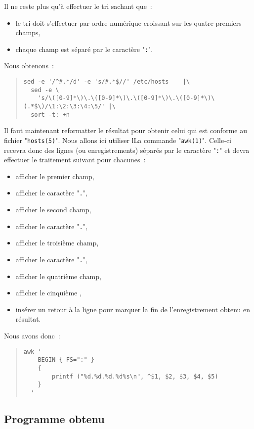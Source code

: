 Il ne reste plus qu'{\`a} effectuer le tri sachant que~:
\begin{itemize}
	\item	le tri doit s'effectuer par ordre num{\'e}rique croissant sur les
			quatre premiers champs,
	\item	chaque champ est s{\'e}par{\'e} par le caract{\`e}re "{\tt :}".
\end{itemize}
Nous obtenons~:
\begin{quote}
\begin{verbatim}
sed -e '/^#.*/d' -e 's/#.*$//' /etc/hosts    |\
  sed -e \
    's/\([0-9]*\)\.\([0-9]*\)\.\([0-9]*\)\.\([0-9]*\)\(.*$\)/\1:\2:\3:\4:\5/' |\
  sort -t: +n
\end{verbatim}
\end{quote}

Il faut maintenant reformatter le r{\'e}sultat pour obtenir celui qui est conforme
au fichier "{\tt hosts(5)}". Nous allons ici utiliser lLa commande "{\tt awk(1)}".
Celle-ci recevra donc des lignes (ou enregistrements) s{\'e}par{\'e}s par le caract{\`e}re "{\tt :}"
et devra effectuer le traitement suivant pour chacunes~:
\begin{itemize}
	\item	afficher le premier champ,
	\item	afficher le caract{\`e}re "{\tt .}",
	\item	afficher le second champ,
	\item	afficher le caract{\`e}re "{\tt .}",
	\item	afficher le troisi{\`e}me champ,
	\item	afficher le caract{\`e}re "{\tt .}",
	\item	afficher le quatri{\`e}me champ,
	\item	afficher le cinqui{\`e}me ,
	\item	ins{\'e}rer un retour {\`a} la ligne pour marquer la fin de l'enregistrement obtenu
			en r{\'e}sultat.
\end{itemize}
Nous avons donc~:
\begin{quote}
\begin{verbatim}
awk '
    BEGIN { FS=":" }
    {
        printf ("%d.%d.%d.%d%s\n", ^$1, $2, $3, $4, $5)
    }
  '
\end{verbatim}
\end{quote}

\subsection{Programme obtenu}

